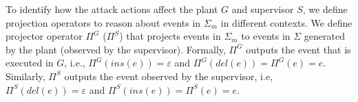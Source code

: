 To identify how the attack actions affect the plant $G$ and supervisor $S$, we define projection operators to reason about events in $\Sigma_m$ in different contexts.
We define projector operator $\Pi^G$ ($\Pi^S$) that projects events in $\Sigma_m$ to events in $\Sigma$ generated by the plant (observed by the supervisor).
Formally, $\Pi^G$ outputs the event that is executed in $G$, i.e., $\Pi^G(ins(e)) = \varepsilon$ and $\Pi^G(del(e)) = \Pi^G(e) = e$. 
Similarly, $\Pi^S$ outputs the event observed by the supervisor, i.e, $\Pi^S(del(e)) = \varepsilon$ and $\Pi^S(ins(e)) = \Pi^S(e) = e$. 




